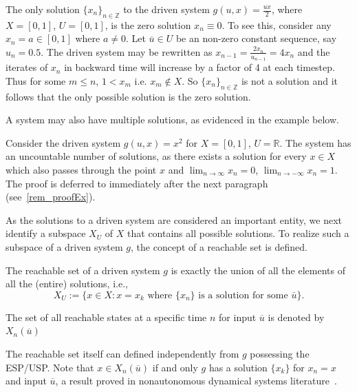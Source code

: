 \begin{Example}\label{ex_halfux} \rm
  The only solution  ${\{x_n\}}_{n\in\mathbb{Z}}$ to the driven system  $g(u,x)=\frac{ux}{2}$, where $X=[0,1]$, $U=[0,1]$,  is the zero solution $x_n\equiv0$.
  To see this, consider any $x_n=a\in[0,1]$ where $a\neq{0}$.  Let $\overline{u}\in{U}$ be an non-zero constant sequence, say $u_n=0.5$. 
  The driven system may be rewritten as $x_{n-1}=\frac{2x_n}{u_{n-1}}=4x_n$ and the  iterates of $x_n$ in backward time will increase by a factor of 4 at each timestep. 
  Thus for some $m\leq{n}$,  $1<x_m$ i.e. $x_m\notin{X}$. So ${\{x_n\}}_{n\in\mathbb{Z}}$ is not a solution and it follows that the only possible solution is the zero solution.
\end{Example}


A system may also have multiple solutions, as evidenced in the example below.

\begin{Example}\label{Ex_exp} \rm 
  Consider the driven system $g(u,x)=x^2$ for $X=[0,1]$, $U=\mathbb{R}$. The system has an uncountable number of solutions, as there exists a solution for every $x\in{X}$ which also passes through the point $x$ and $\lim_{n\to\infty}x_n=0$, $\lim_{n\to{-}\infty}x_n=1$.  
 The proof is deferred to immediately after the next paragraph (see~\ref{rem_proofEx}).
\end{Example}

As the solutions to a driven system are considered an important entity, we next identify a subspace $X_U$ of $X$ that contains all possible solutions. To realize such a subspace of a driven system $g$, the concept of a reachable set is defined.

\begin{Definition}
  \label{Dfn_ReachableSet}\rm
The reachable set of a driven system $g$ is exactly the union of all the elements of all the (entire) solutions, i.e., 
\begin{equation}
  X_U :=\Big \{x \in X:  x = x_k \mbox{ where  $\{x_n\}$  is a solution for some  $\bar{u}$} \Big \}.  
\end{equation}

The set of all reachable states at a specific time $n$ for input $\overline{u}$ is denoted by $X_n(\overline{u})$
\end{Definition}

The reachable set itself can defined independently from $g$ possessing the ESP/USP. Note that $x\in{X_n(\overline{u})}$ if and only $g$ has a solution $\{x_k\}$ for $x_n=x$ and input $\overline{u}$, a result proved in nonautonomous dynamical systems literature~\cite{manjunath2014dynamics, manjunath2013echo}.

